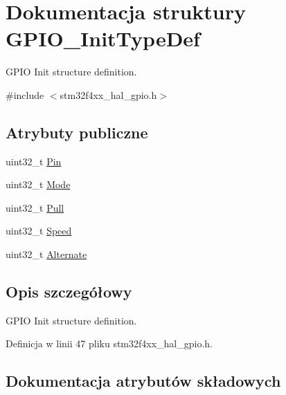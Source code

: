 \hypertarget{struct_g_p_i_o___init_type_def}{}\section{Dokumentacja struktury G\+P\+I\+O\+\_\+\+Init\+Type\+Def}
\label{struct_g_p_i_o___init_type_def}


G\+P\+IO Init structure definition.  




{\ttfamily \#include $<$stm32f4xx\+\_\+hal\+\_\+gpio.\+h$>$}

\subsection*{Atrybuty publiczne}
\begin{DoxyCompactItemize}
\item 
uint32\+\_\+t \hyperlink{struct_g_p_i_o___init_type_def_aa807fb62b2b2cf937092abba81370b87}{Pin}
\item 
uint32\+\_\+t \hyperlink{struct_g_p_i_o___init_type_def_a3731d84343e65a98fdf51056a8d30321}{Mode}
\item 
uint32\+\_\+t \hyperlink{struct_g_p_i_o___init_type_def_aa2d3a6b0c4e10ac20882b4a37799ced1}{Pull}
\item 
uint32\+\_\+t \hyperlink{struct_g_p_i_o___init_type_def_aae3b8ba407fb4f974cbce9cc03fc189d}{Speed}
\item 
uint32\+\_\+t \hyperlink{struct_g_p_i_o___init_type_def_aa1bf7132c974a10589d6574d50465256}{Alternate}
\end{DoxyCompactItemize}


\subsection{Opis szczegółowy}
G\+P\+IO Init structure definition. 

Definicja w linii 47 pliku stm32f4xx\+\_\+hal\+\_\+gpio.\+h.



\subsection{Dokumentacja atrybutów składowych}
\mbox{\label{struct_g_p_i_o___init_type_def_aa1bf7132c974a10589d6574d50465256}} 
